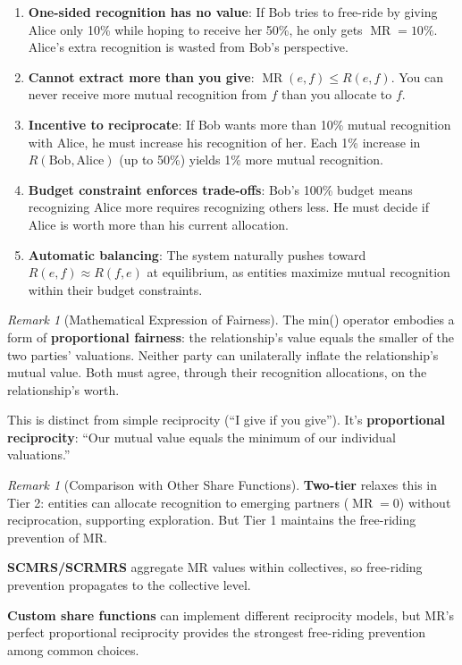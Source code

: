 \documentclass[11pt,a4paper]{article}
\theoremstyle{definition}
\theoremstyle{remark}
\newtheorem{remark}[theorem]{Remark}
\DeclareMathOperator{\MR}{MR}
\begin{document}
\begin{enumerate}
\item \textbf{One-sided recognition has no value}: If Bob tries to free-ride by giving Alice only 10\% while hoping to receive her 50\%, he only gets $\MR = 10\%$. Alice's extra recognition is wasted from Bob's perspective.

\item \textbf{Cannot extract more than you give}: $\MR(e,f) \le R(e,f)$. You can never receive more mutual recognition from $f$ than you allocate to $f$.

\item \textbf{Incentive to reciprocate}: If Bob wants more than 10\% mutual recognition with Alice, he must increase his recognition of her. Each 1\% increase in $R(\text{Bob}, \text{Alice})$ (up to 50\%) yields 1\% more mutual recognition.

\item \textbf{Budget constraint enforces trade-offs}: Bob's 100\% budget means recognizing Alice more requires recognizing others less. He must decide if Alice is worth more than his current allocation.

\item \textbf{Automatic balancing}: The system naturally pushes toward $R(e,f) \approx R(f,e)$ at equilibrium, as entities maximize mutual recognition within their budget constraints.
\end{enumerate}

\begin{remark}[Mathematical Expression of Fairness]
The min() operator embodies a form of \textbf{proportional fairness}: the relationship's value equals the smaller of the two parties' valuations. Neither party can unilaterally inflate the relationship's mutual value. Both must agree, through their recognition allocations, on the relationship's worth.

This is distinct from simple reciprocity (``I give if you give''). It's \textbf{proportional reciprocity}: ``Our mutual value equals the minimum of our individual valuations.''
\end{remark}

\begin{remark}[Comparison with Other Share Functions]
\textbf{Two-tier} relaxes this in Tier 2: entities can allocate recognition to emerging partners ($\MR = 0$) without reciprocation, supporting exploration. But Tier 1 maintains the free-riding prevention of MR.

\textbf{SCMRS/SCRMRS} aggregate MR values within collectives, so free-riding prevention propagates to the collective level.

\textbf{Custom share functions} can implement different reciprocity models, but MR's perfect proportional reciprocity provides the strongest free-riding prevention among common choices.
\end{remark}
\end{document}
